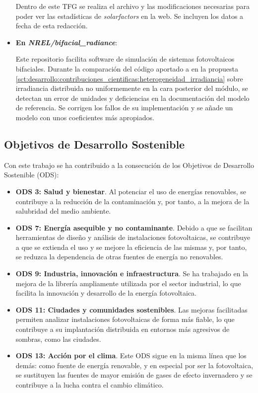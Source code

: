 \begin{itemize}
          Dentro de este TFG se realiza el archivo y las modificaciones necesarias para poder ver las estadísticas de \textit{solarfactors} en la web. Se incluyen los datos a fecha de esta redacción.

    \item \textbf{En \textit{NREL/bifacial\_radiance}}:
    
          Este \gls{repositorio} facilita \gls{software} de simulación de sistemas fotovoltaicos bifaciales. Durante la comparación del código aportado a \pvlibpy{} en la propuesta \ref{sct:desarrollo:contribuciones_cientificas:heterogeneidad_irradiancia} sobre irradiancia distribuida no uniformemente en la cara posterior del \gls{módulo}, se detectan un error de unidades y deficiencias en la documentación del modelo de referencia. Se corrigen los fallos de su implementación y se añade un modelo con unos coeficientes más apropiados.

\end{itemize}


\subsection{Objetivos de Desarrollo Sostenible} \label{sssct:impacto:ods}

Con este trabajo se ha contribuido a la consecución de los Objetivos de Desarrollo Sostenible (ODS):

\begin{itemize}
    \item \textbf{ODS 3: Salud y bienestar}. Al potenciar el uso de energías renovables, se contribuye a la reducción de la contaminación y, por tanto, a la mejora de la salubridad del medio ambiente.
    \item \textbf{ODS 7: Energía asequible y no contaminante}. Debido a que se facilitan herramientas de diseño y análisis de instalaciones fotovoltaicas, se contribuye a que se extienda el uso y se mejore la eficiencia de las mismas y, por tanto, se reduzca la dependencia de otras fuentes de energía no renovables.
    \item \textbf{ODS 9: Industria, innovación e infraestructura}. Se ha trabajado en la mejora de la librería \pvlibpy{} ampliamente utilizada por el sector industrial, lo que facilita la innovación y desarrollo de la energía fotovoltaica.
    \item \textbf{ODS 11: Ciudades y comunidades sostenibles}. Las mejoras facilitadas permiten analizar instalaciones fotovoltaicas de forma más fiable, lo que contribuye a su implantación distribuida en entornos más agresivos de sombras, como las ciudades.
    \item \textbf{ODS 13: Acción por el clima}. Este ODS sigue en la misma línea que los demás: como fuente de energía renovable, y en especial por ser la fotovoltaica, se sustituyen las fuentes de mayor emisión de gases de efecto invernadero y se contribuye a la lucha contra el cambio climático.
\end{itemize}


